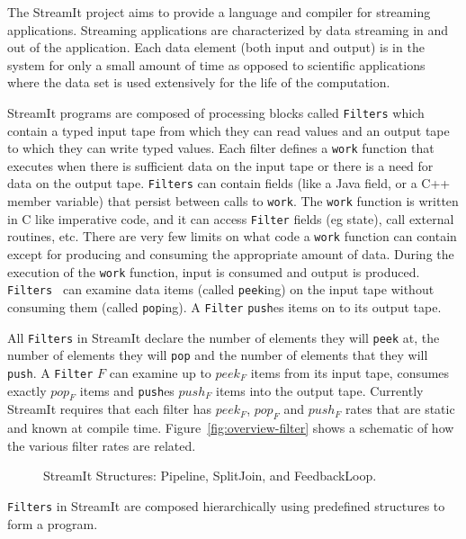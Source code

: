 The StreamIt\cite{thies02streamit,thies01streamit,william-stream,michal-common} project
aims to provide a language and compiler for streaming applications. Streaming applications 
are characterized by data streaming in and out of the application. Each data element (both
input and output) is in the system for only a small amount of time as opposed to scientific
applications where the data set is used extensively for the life of the computation.
 
StreamIt programs are composed of processing blocks called {\tt Filters} which
contain a typed input tape from which they can read values and an output tape to which
they can write typed values. Each filter defines a {\tt work} function that executes when there
is sufficient data on the input tape or there is a need for data on the output tape.
{\tt Filters} can contain fields (like a Java field, or a C++ member variable) that
persist between calls to {\tt work}. The {\tt work} function is written in C like imperative code, 
and it can access {\tt Filter} fields (eg state), call external routines, etc.
There are very few limits on what code a {\tt work} function can contain except for
producing and consuming the appropriate amount of data.  
During the execution of the {\tt work} function, input is consumed and output is produced.
{\tt Filters } can examine data items (called {\tt peek}ing) on the input tape without
consuming them (called {\tt pop}ing). A {\tt Filter} {\tt push}es items on to its output tape.

All {\tt Filters} in StreamIt declare the number of elements they
will {\tt peek} at, the number of elements they will {\tt pop} and the number
of elements that they will {\tt push}. A {\tt Filter} $F$ can examine up to $peek_{F}$ 
items from its input tape, consumes exactly $pop_{F}$ items and {\tt push}es 
$push_{F}$ items into the output tape. Currently StreamIt requires that each filter has 
$peek_F$, $pop_F$ and $push_F$ rates that are static and known at compile time. 
Figure~\ref{fig:overview-filter} shows a schematic of how the various filter rates are related.

\begin{figure}
\center
\epsfxsize=3.0in
\caption{StreamIt Structures: Pipeline, SplitJoin, and FeedbackLoop.}
\label{fig:structures}
\end{figure}

{\tt Filters} in StreamIt are composed hierarchically using predefined structures to form
a program. 

